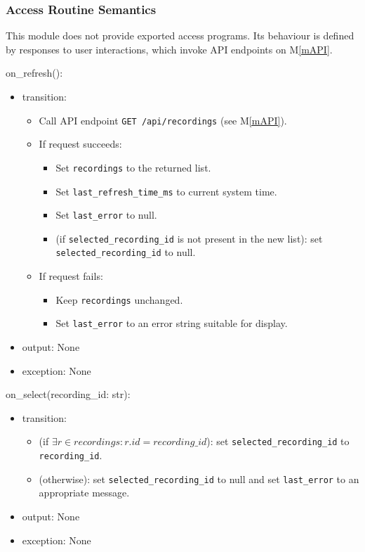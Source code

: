 \documentclass[12pt, titlepage]{article}
\newcommand{\mref}[1]{M\ref{#1}}
\begin{document}
\subsubsection{Access Routine Semantics}

This module does not provide exported access programs. Its behaviour is defined
by responses to user interactions, which invoke API endpoints on \mref{mAPI}.

\noindent on\_refresh():
\begin{itemize}
  \item transition:
        \begin{itemize}
          \item Call API endpoint \texttt{GET /api/recordings} (see \mref{mAPI}).
          \item If request succeeds:
                \begin{itemize}
                  \item Set \texttt{recordings} to the returned list.
                  \item Set \texttt{last\_refresh\_time\_ms} to current system time.
                  \item Set \texttt{last\_error} to null.
                  \item (if \texttt{selected\_recording\_id} is not present in the new list): set \texttt{selected\_recording\_id} to null.
                \end{itemize}
          \item If request fails:
                \begin{itemize}
                  \item Keep \texttt{recordings} unchanged.
                  \item Set \texttt{last\_error} to an error string suitable for display.
                \end{itemize}
        \end{itemize}
  \item output: None
  \item exception: None
\end{itemize}

\noindent on\_select(recording\_id: str):
\begin{itemize}
  \item transition:
        \begin{itemize}
          \item (if $\exists r \in recordings: r.id = recording\_id$): set \texttt{selected\_recording\_id} to \texttt{recording\_id}.
          \item (otherwise): set \texttt{selected\_recording\_id} to null and set \texttt{last\_error} to an appropriate message.
        \end{itemize}
  \item output: None
  \item exception: None
\end{itemize}
\end{document}
